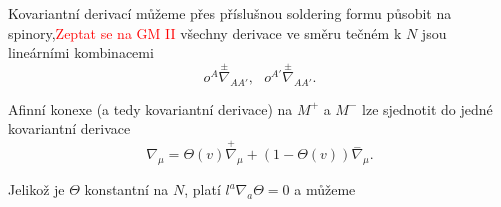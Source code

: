Kovariantní derivací můžeme přes příslušnou soldering formu působit na spinory,\textcolor{red}{Zeptat se na GM II}
všechny derivace ve směru tečném k $N$ jsou lineárními kombinacemi
\begin{equation}
    o^A \stackrel{\pm}{\nabla}_{AA'}, ~~~ o^{A'} \stackrel{\pm}{\nabla}_{AA'}.
\end{equation}

Afinní konexe (a tedy kovariantní derivace) na $M^+$ a $M^-$ lze sjednotit do jedné kovariantní derivace
\begin{equation}
    \nabla_\mu = \Theta(v) \stackrel{+}{\nabla}_\mu + (1-\Theta(v)) \stackrel{-}{\nabla}_\mu.
\end{equation}

Jelikož je $\Theta$ konstantní na $N$, platí $l^a \nabla_a \Theta = 0$ a můžeme 
